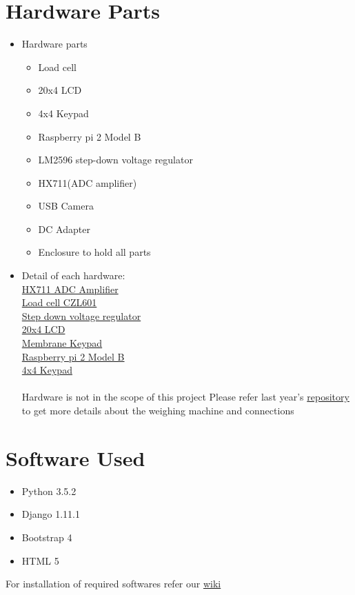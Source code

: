 \documentclass[a4paper,12pt,oneside]{book}
\begin{document}
	\section{Hardware Parts}
	\begin{itemize}
		\item Hardware parts
		\begin{itemize}
			\item Load cell
			\item 20x4 LCD
			\item 4x4 Keypad
			\item Raspberry pi 2 Model B
			\item LM2596 step-down voltage regulator
			\item HX711(ADC amplifier)
			\item USB Camera
			\item DC Adapter
			\item Enclosure to hold all parts
		\end{itemize}
		\item Detail of each hardware:\\
		\href{https://cdn.sparkfun.com/datasheets/Sensors/ForceFlex/hx711_english.pdf}{HX711 ADC Amplifier}\\
		\href{http://www.kadcontrols.com/KadWebsite/LoadCell_Tech/CZL601.pdf}{Load cell CZL601}\\
		\href{http://www.onsemi.com/pub_link/Collateral/LM2596-D.PDF}{Step down voltage regulator}\\
		\href{http://lispol.com/uploaded/products_files/1364491305_79923300.pdf}{20x4 LCD}\\
		\href{https://www.parallax.com/sites/default/files/downloads/27899-4x4-Matrix-Membrane-Keypad-v1.2.p    df}{Membrane Keypad}\\
		\href{https://cdn-shop.adafruit.com/pdfs/raspberrypi2modelb.pdf}{Raspberry pi 2 Model B}\\
		\href{https://www.parallax.com/sites/default/files/downloads/27899-4x4-Matrix-Membrane-Keypad-v1.2.pdf}{4x4 Keypad}\\
		\\
		Hardware is not in the scope of this project
		Please refer last year's \href{https://github.com/Ankurrpanwar26/eYSIP-2016-Farm-Produce-Logging-and-Monitoring/blob/master/Final%20Report/EYSIP_final.pdf}{repository} to get more details about the weighing machine and connections
		\end{itemize}
		
		\section{Software Used}
		\begin{itemize}
			\item Python 3.5.2
			\item Django 1.11.1
			\item Bootstrap 4
			\item HTML 5
		\end{itemize}
		For installation of required softwares refer our \href{https://github.com/eYSIP-2017/eYSIP-2017_Development_of_Web_Interface_for_GH_Farm_Produce/wiki}{wiki} 
		
\end{document}
